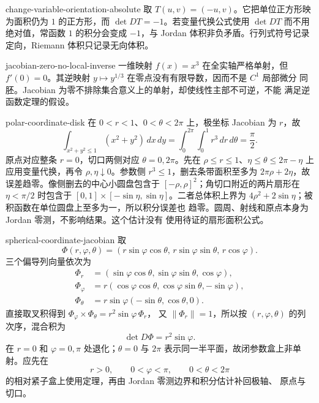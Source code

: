 \begin{solution}{change-variable-orientation-absolute}
取 \(T(u,v)=(-u,v)\)。它把单位正方形映为面积仍为 \(1\) 的正方形，而
\(\det DT=-1\)。若变量代换公式使用 \(\det DT\) 而不用绝对值，常函数
\(1\) 的积分会变成 \(-1\)，与 Jordan 体积非负矛盾。行列式符号记录
定向，Riemann 体积只记录无向体积。
\end{solution}

\begin{solution}{jacobian-zero-no-local-inverse}
一维映射 \(f(x)=x^3\) 在全实轴严格单射，但 \(f'(0)=0\)。其逆映射
\(y\mapsto y^{1/3}\) 在零点没有有限导数，因而不是 \(C^1\) 局部微分
同胚。Jacobian 为零不排除集合意义上的单射，却使线性主部不可逆，不能
满足逆函数定理的假设。
\end{solution}

\begin{solution}{polar-coordinate-disk}
在 \(0<r<1\)、\(0<\theta<2\pi\) 上，极坐标 Jacobian 为 \(r\)，故
\[
 \int_{x^2+y^2\le1}(x^2+y^2)\,dx\,dy
 =\int_0^{2\pi}\int_0^1r^3\,dr\,d\theta
 =\frac{\pi}{2}.
\]
原点对应整条 \(r=0\)，切口两侧对应 \(\theta=0,2\pi\)。先在
\(\rho\le r\le1\)、\(\eta\le\theta\le2\pi-\eta\) 上应用变量代换，再令
\(\rho,\eta\downarrow0\)。参数侧 $r^3\le1$，删去条带面积至多为
$2\pi\rho+2\eta$，故误差趋零。像侧删去的中心小圆盘包含于
$[-\rho,\rho]^2$；角切口附近的两片扇形在 $\eta<\pi/2$ 时包含于
$[0,1]\times[-\sin\eta,\sin\eta]$。二者总体积上界为
$4\rho^2+2\sin\eta$；被积函数在单位圆盘上至多为一，所以积分误差也
趋零。圆周、射线和原点本身为 Jordan 零测，不影响结果。这个估计没有
使用待证的扇形面积公式。
\end{solution}

\begin{solution}{spherical-coordinate-jacobian}
取
\[
 \Phi(r,\varphi,\theta)
 =(r\sin\varphi\cos\theta,\,
   r\sin\varphi\sin\theta,\,
   r\cos\varphi).
\]
三个偏导列向量依次为
\begin{align*}
 \Phi_r&=(\sin\varphi\cos\theta,\sin\varphi\sin\theta,\cos\varphi),\\
 \Phi_\varphi&=r(\cos\varphi\cos\theta,\cos\varphi\sin\theta,-\sin\varphi),\\
 \Phi_\theta&=r\sin\varphi(-\sin\theta,\cos\theta,0).
\end{align*}
直接取叉积得到 $\Phi_\varphi\times\Phi_\theta=r^2\sin\varphi\,\Phi_r$，
又 $\|\Phi_r\|=1$，所以按 $(r,\varphi,\theta)$ 的列次序，混合积为
\[
 \det D\Phi=r^2\sin\varphi.
\]
在 \(r=0\) 和 \(\varphi=0,\pi\) 处退化；\(\theta=0\) 与 \(2\pi\)
表示同一半平面，故闭参数盒上非单射。应先在
\[
 r>0,\qquad0<\varphi<\pi,\qquad0<\theta<2\pi
\]
的相对紧子盒上使用定理，再由 Jordan 零测边界和积分估计补回极轴、
原点与切口。
\end{solution}

